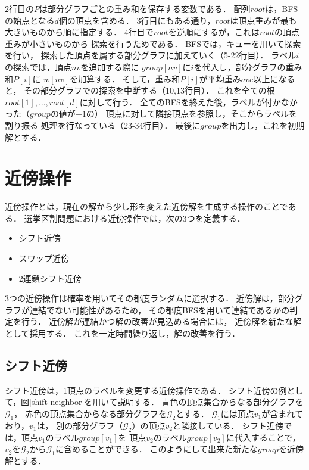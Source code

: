 2行目の$P$は部分グラフごとの重み和を保存する変数である．
配列$root$は，BFSの始点となる$d$個の頂点を含める．
3行目にもある通り，$root$は頂点重みが最も大きいものから順に指定する．
4行目で$root$を逆順にするが，これは$root$の頂点重みが小さいものから
探索を行うためである．
BFSでは，キューを用いて探索を行い，
探索した頂点を属する部分グラフに加えていく（5-22行目）．
ラベル$i$の探索では，頂点$nv$を追加する際に
$group[nv]$に$i$を代入し，部分グラフの重み和$P[i]$に
$w[nv]$を加算する．
そして，重み和$P[i]$が平均重み$ave$以上になると，
その部分グラフでの探索を中断する（10,13行目）．
これを全ての根$root[1],\ldots,root[d]$に対して行う．
全てのBFSを終えた後，ラベルが付かなかった（$group$の値が$-1$の）
頂点に対して隣接頂点を参照し，そこからラベルを割り振る
処理を行なっている（23-34行目）．
最後に$group$を出力し，これを初期解とする．

\section{近傍操作}

近傍操作とは，現在の解から少し形を変えた近傍解を生成する操作のことである．
選挙区割問題における近傍操作では，次の3つを定義する．
\begin{itemize}
  \item シフト近傍
  \item スワップ近傍
  \item 2連鎖シフト近傍
\end{itemize}

3つの近傍操作は確率を用いてその都度ランダムに選択する．
近傍解は，部分グラフが連結でない可能性があるため，
その都度BFSを用いて連結であるかの判定を行う．
近傍解が連結かつ解の改善が見込める場合には，
近傍解を新たな解として採用する．
これを一定時間繰り返し，解の改善を行う．

\subsection{シフト近傍}

シフト近傍は，1頂点のラベルを変更する近傍操作である．
シフト近傍の例として，図\ref{shift-neighbor}を用いて説明する．
青色の頂点集合からなる部分グラフを$\mathcal{G}_1$，
赤色の頂点集合からなる部分グラフを$\mathcal{G}_2$とする．
$\mathcal{G}_1$には頂点$v_1$が含まれており，$v_1$は，
別の部分グラフ（$\mathcal{G}_2$）の頂点$v_2$と隣接している．
シフト近傍では，頂点$v_1$のラベル$group[v_1]$を
頂点$v_2$のラベル$group[v_2]$に代入することで，
$v_2$を$\mathcal{G}_2$から$\mathcal{G}_1$に含めることができる．
このようにして出来た新たな$group$を近傍解とする．


